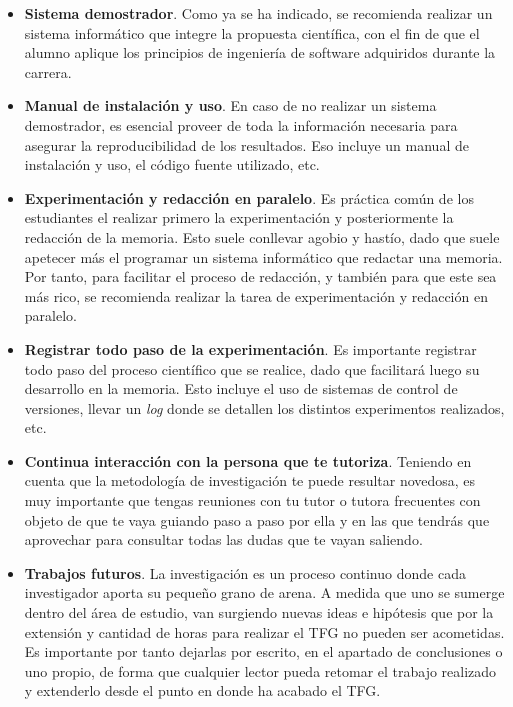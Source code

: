\begin{itemize}
    \item \textbf{Sistema demostrador}. Como ya se ha indicado, se recomienda realizar un sistema informático que integre la propuesta científica, con el fin de que el alumno aplique los principios de ingeniería de software adquiridos durante la carrera. 
    
    \item \textbf{Manual de instalación y uso}. En caso de no realizar un sistema demostrador, es esencial proveer de toda la información necesaria para asegurar la reproducibilidad de los resultados. Eso incluye un manual de instalación y uso, el código fuente utilizado, etc.

    \item \textbf{Experimentación y redacción en paralelo}. Es práctica común de los estudiantes el realizar primero la experimentación y posteriormente la redacción de la memoria. Esto suele conllevar agobio y hastío, dado que suele apetecer más el programar un sistema informático que redactar una memoria. Por tanto, para facilitar el proceso de redacción, y también para que este sea más rico, se recomienda realizar la tarea de experimentación y redacción en paralelo.

    \item \textbf{Registrar todo paso de la experimentación}. Es importante registrar todo paso del proceso científico que se realice, dado que facilitará luego su desarrollo en la memoria. Esto incluye el uso de sistemas de control de versiones, llevar un \textit{log} donde se detallen los distintos experimentos realizados, etc.

    \item \textbf{Continua interacción con la persona que te tutoriza}. Teniendo en cuenta que la metodología de investigación te puede resultar novedosa, es muy importante que tengas reuniones con tu tutor o tutora frecuentes con objeto de que te vaya guiando paso a paso por ella y en las que tendrás que aprovechar para consultar todas las dudas que te vayan saliendo.

    \item \textbf{Trabajos futuros}. La investigación es un proceso continuo donde cada investigador aporta su pequeño grano de arena. A medida que uno se sumerge dentro del área de estudio, van surgiendo nuevas ideas e hipótesis que por la extensión y cantidad de horas para realizar el TFG no pueden ser acometidas. Es importante por tanto dejarlas por escrito, en el apartado de conclusiones o uno propio, de forma que cualquier lector pueda retomar el trabajo realizado y extenderlo desde el punto en donde ha acabado el TFG.


\end{itemize}
